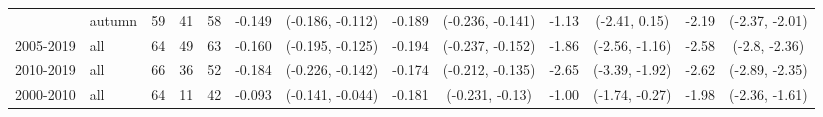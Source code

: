 \begin{table}[h]
\begin{center}
{\begin{tabular}{ll|ccc|cccc|cccc}
          & autumn &              59 &          41 &          58 &                  -0.149 &  (-0.186, -0.112) & -0.189 &  (-0.236, -0.141) &                    -1.13 &   (-2.41, 0.15) & -2.19 &  (-2.37, -2.01) \\
2005-2019 & all &              64 &          49 &          63 &                  -0.160 &  (-0.195, -0.125) & -0.194 &  (-0.237, -0.152) &                    -1.86 &  (-2.56, -1.16) & -2.58 &   (-2.8, -2.36) \\
2010-2019 & all &              66 &          36 &          52 &                  -0.184 &  (-0.226, -0.142) & -0.174 &  (-0.212, -0.135) &                    -2.65 &  (-3.39, -1.92) & -2.62 &  (-2.89, -2.35) \\
2000-2010 & all &              64 &          11 &          42 &                  -0.093 &  (-0.141, -0.044) & -0.181 &   (-0.231, -0.13) &                    -1.00 &  (-1.74, -0.27) & -1.98 &  (-2.36, -1.61) \\
\bottomrule
\end{tabular}}
\end{center}
\end{table}



